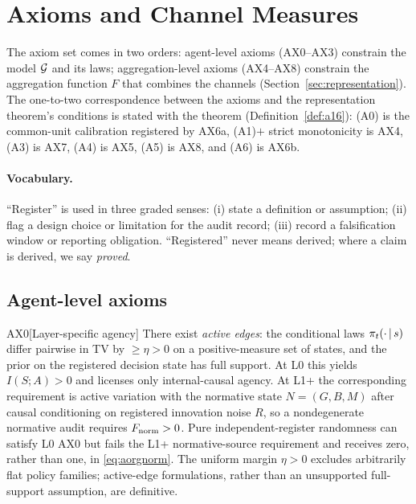\section{Axioms and Channel Measures}\label{sec:axioms}

The axiom set comes in two orders: agent-level axioms (AX0--AX3) constrain the
model $\mathcal{G}$ and its laws; aggregation-level axioms (AX4--AX8) constrain the
aggregation function $F$ that combines the channels
(Section~\ref{sec:representation}). The one-to-two correspondence between the
axioms and the representation theorem's conditions is stated with the theorem
(Definition~\ref{def:a16}): \textup{(A0)} is the common-unit calibration
registered by AX6a, \textup{(A1)}$+$ strict monotonicity is AX4,
\textup{(A3)} is AX7, \textup{(A4)} is AX5, \textup{(A5)} is AX8, and
\textup{(A6)} is AX6b.

\paragraph{Vocabulary.} ``Register'' is used in three graded senses: (i)
state a definition or assumption; (ii) flag a design choice or limitation for
the audit record; (iii) record a falsification window or reporting
obligation. ``Registered'' never means derived; where a claim is derived, we
say \emph{proved}.

\subsection{Agent-level axioms}

\begin{axiom}{AX0}[Layer-specific agency]\label{ax:0}
There exist \emph{active edges}: the conditional laws $\pi_t(\cdot\,|\, s)$
differ pairwise in TV by $\ge\eta>0$ on a positive-measure set of states, and
the prior on the registered decision state has full support. At L0 this yields
$I(S;A)>0$ and licenses only internal-causal agency. At L1+ the corresponding
requirement is active variation with the normative state $N=(G,B,M)$ after
causal conditioning on registered innovation noise $R$, so a nondegenerate
normative audit requires $F_{\mathrm{norm}}>0$. Pure independent-register randomness can
satisfy L0 AX0 but fails the L1+ normative-source requirement and receives
zero, rather than one, in \eqref{eq:aorgnorm}. The uniform margin
$\eta>0$ excludes arbitrarily flat policy families; active-edge formulations,
rather than an unsupported full-support assumption, are definitive.
\end{axiom}

